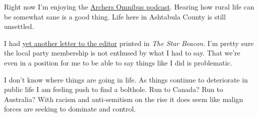 Right now I'm enjoying the
\href{http://www.bbc.co.uk/programmes/b006qnkc}{Archers Omnibus
podcast}. Hearing how rural life can be somewhat sane is a good thing.
Life here in Ashtabula County is still unsettled.

I had
\href{https://web.archive.org/web/20221029073248/https://www.starbeacon.com/opinion/new-gop-is-on-the-wrong-path/article_e3b35ed8-56eb-11ed-82ad-97837fe5926a.html}{yet
another letter to the editor} printed in \emph{The Star Beacon}. I'm
pretty sure the local party membership is not enthused by what I had to
say. That we're even in a position for me to be able to say things like
I did is problematic.

I don't know where things are going in life. As things continue to
deteriorate in public life I am feeling push to find a bolthole. Run to
Canada? Run to Australia? With racism and anti-semitism on the rise it
does seem like malign forces are seeking to dominate and control.

